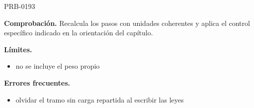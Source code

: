 \begin{studiumworked}{PRB-0193}
\par\textbf{Comprobación.} Recalcula los pasos con unidades coherentes y aplica el control específico indicado en la orientación del capítulo.

\textbf{Límites.}\begin{itemize}\item no se incluye el peso propio\end{itemize}

\textbf{Errores frecuentes.}\begin{itemize}\item olvidar el tramo sin carga repartida al escribir las leyes\end{itemize}

\end{studiumworked}

\Needspace{.3\textheight}


